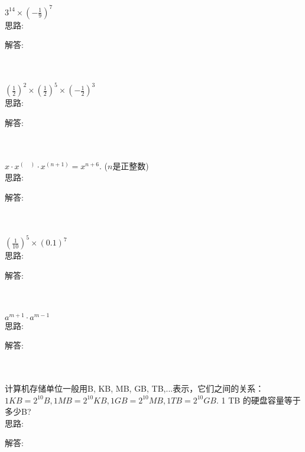 \item {
    $ 3^{14}\times (-\frac19)^7 $ 
    \ifshowSolution
        \fangsong{}
        \\
        思路:

        解答: 
    \else
        \\ \\ \\
    \fi
}

\item {
    $ (\frac12)^2\times (\frac12)^5\times (-\frac12)^3 $ 
    \ifshowSolution
        \fangsong{}
        \\
        思路:

        解答: 
    \else
        \\ \\ \\
    \fi
}

\item {
    $ x\cdot x^{(\quad)}\cdot x^{(n+1)} = x^{n+6}. $ ($n$是正整数) 
    \ifshowSolution
        \fangsong{}
        \\
        思路:

        解答: 
    \else
        \\ \\ \\
    \fi
}

\item {
    $ (\frac{1}{10})^5 \times (0.1)^7$
    \ifshowSolution
        \fangsong{}
        \\
        思路:

        解答: 
    \else
        \\ \\ \\
    \fi
}

\item {
    $ a^{m+1}\cdot a^{m-1}$
    \ifshowSolution
        \fangsong{}
        \\
        思路:

        解答: 
    \else
        \\ \\ \\
    \fi
}

\item {
    计算机存储单位一般用B, KB, MB, GB, TB,...表示，它们之间的关系：$1 KB = 2^{10} B, 1 MB = 2^{10} KB, 1 GB = 2^{10} MB, 1 TB = 2^{10} GB.$ 1 TB 的硬盘容量等于多少B?
    \ifshowSolution
        \fangsong{}
        \\
        思路:

        解答: 
    \else
        \\ \\ \\
    \fi
}


